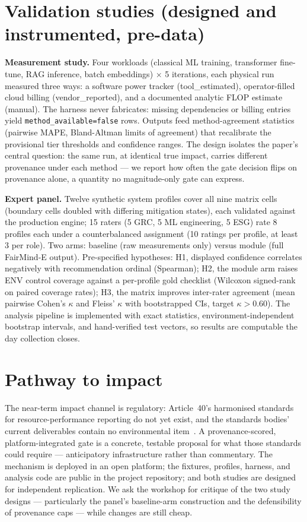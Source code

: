 \documentclass[10pt]{article}
\begin{document}
\section{Validation studies (designed and instrumented, pre-data)}
\label{sec:studies}

\textbf{Measurement study.} Four workloads (classical ML training,
transformer fine-tune, RAG inference, batch embeddings) $\times$ 5
iterations, each physical run measured three ways: a software power tracker
(tool\_estimated), operator-filled cloud billing (vendor\_reported), and a
documented analytic FLOP estimate (manual). The harness never fabricates:
missing dependencies or billing entries yield
\texttt{method\_available=false} rows. Outputs feed method-agreement
statistics (pairwise MAPE, Bland-Altman limits of agreement) that recalibrate
the provisional tier thresholds and confidence ranges. The design isolates
the paper's central question: the same run, at identical true impact, carries
different provenance under each method --- we report how often the gate
decision flips on provenance alone, a quantity no magnitude-only gate can
express.

\textbf{Expert panel.} Twelve synthetic system profiles cover all nine matrix
cells (boundary cells doubled with differing mitigation states), each
validated against the production engine; 15 raters (5 GRC, 5 ML engineering,
5 ESG) rate 8 profiles each under a counterbalanced assignment (10 ratings
per profile, at least 3 per role). Two arms: baseline (raw measurements only)
versus module (full FairMind-E output). Pre-specified hypotheses: H1,
displayed confidence correlates negatively with recommendation ordinal
(Spearman); H2, the module arm raises ENV control coverage against a
per-profile gold checklist (Wilcoxon signed-rank on paired coverage rates);
H3, the matrix improves inter-rater agreement (mean pairwise Cohen's
$\kappa$ and Fleiss' $\kappa$ with bootstrapped CIs, target
$\kappa > 0.60$). The analysis pipeline is implemented with exact statistics,
environment-independent bootstrap intervals, and hand-verified test vectors,
so results are computable the day collection closes.

\section{Pathway to impact}

The near-term impact channel is regulatory: Article~40's harmonised standards
for resource-performance reporting do not yet exist, and the standards
bodies' current deliverables contain no environmental
item~\cite{euaiact,facctreg}. A provenance-scored, platform-integrated gate
is a concrete, testable proposal for what those standards could require ---
anticipatory infrastructure rather than commentary. The mechanism is deployed
in an open platform; the fixtures, profiles, harness, and analysis code are
public in the project repository; and both studies are designed for
independent replication. We ask the workshop for critique of the two study
designs --- particularly the panel's baseline-arm construction and the
defensibility of provenance caps --- while changes are still cheap.
\end{document}
